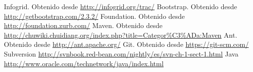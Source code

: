 \begin{thebibliography}{1}
   Infogrid. Obtenido desde  \url{http://infogrid.org/trac/}
   Bootstrap. Obtenido desde  \url{http://getbootstrap.com/2.3.2/}
   Foundation. Obtenido desde  \url{http://foundation.zurb.com/}
   Maven. Obtenido desde  \url{http://chuwiki.chuidiang.org/index.php?title=Categor%C3%ADa:Maven}
   Ant. Obtenido desde  \url{http://ant.apache.org/}
   Git. Obtenido desde  \url{https://git-scm.com/}
   Subversion \url{http://svnbook.red-bean.com/nightly/es/svn-ch-1-sect-1.html}
   Java \url{http://www.oracle.com/technetwork/java/index.html}
\end{thebibliography}


